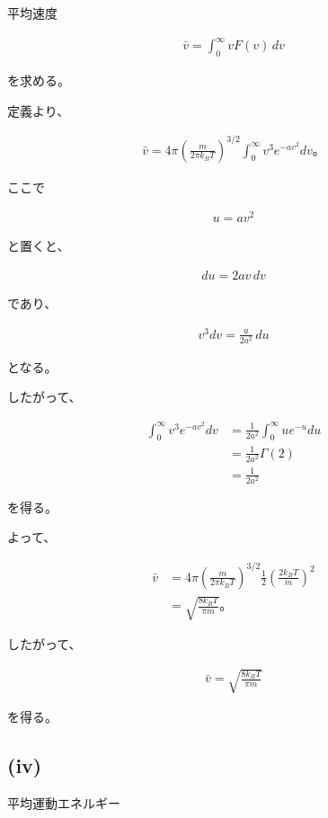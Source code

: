 \documentclass[platex,dvipdfmx,a4paper]{jsarticle}
\begin{document}
平均速度

\begin{align*}
\bar v
=
\int_0^\infty vF(v)\,dv
\end{align*}

を求める。

定義より、

\begin{align*}
\bar v
=
4\pi
\left(
\frac{m}{2\pi k_BT}
\right)^{3/2}
\int_0^\infty
v^3e^{-av^2}dv。
\end{align*}

ここで

\begin{align*}
u=av^2
\end{align*}

と置くと、

\begin{align*}
du=2av\,dv
\end{align*}

であり、

\begin{align*}
v^3dv
=
\frac{u}{2a^2}\,du
\end{align*}

となる。

したがって、

\begin{align*}
\int_0^\infty
v^3e^{-av^2}dv
&=
\frac1{2a^2}
\int_0^\infty ue^{-u}du \\
&=
\frac1{2a^2}
\Gamma(2) \\
&=
\frac1{2a^2}
\end{align*}

を得る。

よって、

\begin{align*}
\bar v
&=
4\pi
\left(
\frac{m}{2\pi k_BT}
\right)^{3/2}
\frac1{2}
\left(
\frac{2k_BT}{m}
\right)^2 \\
&=
\sqrt{\frac{8k_BT}{\pi m}}。
\end{align*}

したがって、

\begin{align*}
\bar v
=
\sqrt{\frac{8k_BT}{\pi m}}
\end{align*}

を得る。

\subsection{(iv)}

平均運動エネルギー
\end{document}
